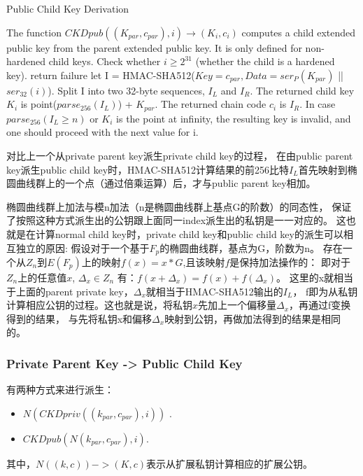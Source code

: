 \begin{algorithm}[tbp]\footnotesize
\caption{Public Child Key Derivation}
  	\begin{algorithmic}[1]
	    \STATE The function $CKDpub((K_{par}, c_{par}), i) \rightarrow (K_i, c_i)$ computes 
	    a child extended public key from the parent extended public key. 
	    It is only defined for non-hardened child keys.
		\STATE Check whether $i \geq 2^{31}$ (whether the child is a hardened key).
			\STATE return failure  
		\ELSE
			\STATE let I = HMAC-SHA512($Key = c_{par}, Data = ser_P(K_{par})$ || $ser_{32}(i)$). 
		\ENDIF
		\STATE Split I into two 32-byte sequences, $I_L$ and $I_R$.
		\STATE The returned child key $K_i$ is point($parse_{256}(I_L)$) + $K_{par}$.  
		\STATE The returned chain code $c_i$ is $I_R$.  
		\STATE In case $parse_{256}(I_L\geq n)$  or $K_i$ is the
		 point at infinity, the resulting key is invalid, and one should proceed with 
		 the next value for i. 
    \end{algorithmic}
\end{algorithm}

对比上一个从private parent key派生private child key的过程，
在由public parent key派生public child key时，HMAC-SHA512计算结果的前256比特$I_L$首先映射到椭圆曲线群上的一个点（通过倍乘运算）后，才与public parent key相加。

椭圆曲线群上加法与模n加法（n是椭圆曲线群上基点G的阶数）的同态性，
保证了按照这种方式派生出的公钥跟上面同一index派生出的私钥是一一对应的。
这也就是在计算normal child key时，private child key和public child key的派生可以相互独立的原因:
假设对于一个基于$F_p$的椭圆曲线群，基点为G，阶数为n。
存在一个从$Z_n$到$E(F_p)$上的映射$f(x)=x*G$,且该映射$f$是保持加法操作的：
即对于$Z_n$上的任意值$x$, $\Delta_x \in Z_n$ 有：$f(x+\Delta_x)=f(x)+f(\Delta_x)$。   
这里的x就相当于上面的parent private key，$\Delta_x$就相当于HMAC-SHA512输出的$I_L$，
f即为从私钥计算相应公钥的过程。这也就是说，将私钥$x$先加上一个偏移量$\Delta_x$，再通过f变换得到的结果，
与先将私钥x和偏移$\Delta_x$映射到公钥，再做加法得到的结果是相同的。

\subsubsection{Private Parent Key -> Public Child Key}
有两种方式来进行派生：
\begin{itemize}
\item $N(CKDpriv((k_{par}, c_{par}), i))$ .  
\item $CKDpub(N(k_{par}, c_{par}), i)$. 
\end{itemize}
其中，$N((k, c)) -> (K, c)$表示从扩展私钥计算相应的扩展公钥。

